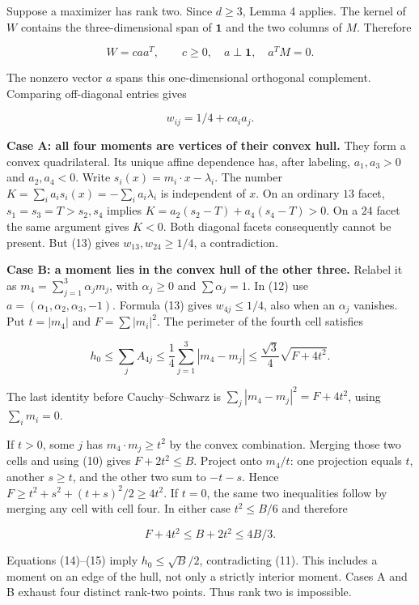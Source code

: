 \documentclass[
  11pt,
]{article}
\begin{document}
Suppose a maximizer has rank two. Since \(d\ge3\), Lemma 4 applies. The
kernel of \(W\) contains the three-dimensional span of \(\mathbf1\) and
the two columns of \(M\). Therefore

\[
 W=c aa^T,\qquad c\ge0,\quad
 a\perp\mathbf1,\quad a^TM=0.                           \tag{12}
\]

The nonzero vector \(a\) spans this one-dimensional orthogonal
complement. Comparing off-diagonal entries gives

\[
 w_{ij}=1/4+c a_i a_j.                                  \tag{13}
\]

\textbf{Case A: all four moments are vertices of their convex hull.}
They form a convex quadrilateral. Its unique affine dependence has,
after labeling, \(a_1,a_3>0\) and \(a_2,a_4<0\). Write
\(s_i(x)=m_i\cdot x-\lambda_i\). The number
\(K=\sum_i a_i s_i(x)=-\sum_i a_i\lambda_i\) is independent of \(x\). On
an ordinary \(13\) facet, \(s_1=s_3=T>s_2,s_4\) implies
\(K=a_2(s_2-T)+a_4(s_4-T)>0\). On a \(24\) facet the same argument gives
\(K<0\). Both diagonal facets consequently cannot be present. But (13)
gives \(w_{13},w_{24}\ge1/4\), a contradiction.

\textbf{Case B: a moment lies in the convex hull of the other three.}
Relabel it as \(m_4=\sum_{j=1}^3\alpha_jm_j\), with \(\alpha_j\ge0\) and
\(\sum\alpha_j=1\). In (12) use \(a=(\alpha_1,\alpha_2,\alpha_3,-1)\).
Formula (13) gives \(w_{4j}\le1/4\), also when an \(\alpha_j\) vanishes.
Put \(t=|m_4|\) and \(F=\sum|m_i|^2\). The perimeter of the fourth cell
satisfies

\[
 h_0\le\sum_j A_{4j}
    \le\frac14\sum_{j=1}^3|m_4-m_j|
    \le\frac{\sqrt3}{4}\sqrt{F+4t^2}.                    \tag{14}
\]

The last identity before Cauchy--Schwarz is
\(\sum_j|m_4-m_j|^2=F+4t^2\), using \(\sum_i m_i=0\).

If \(t>0\), some \(j\) has \(m_4\cdot m_j\ge t^2\) by the convex
combination. Merging those two cells and using (10) gives
\(F+2t^2\le B\). Project onto \(m_4/t\): one projection equals \(t\),
another \(s\ge t\), and the other two sum to \(-t-s\). Hence
\(F\ge t^2+s^2+(t+s)^2/2\ge4t^2\). If \(t=0\), the same two inequalities
follow by merging any cell with cell four. In either case \(t^2\le B/6\)
and therefore

\[
 F+4t^2\le B+2t^2\le4B/3.                               \tag{15}
\]

Equations (14)--(15) imply \(h_0\le\sqrt B/2\), contradicting (11). This
includes a moment on an edge of the hull, not only a strictly interior
moment. Cases A and B exhaust four distinct rank-two points. Thus rank
two is impossible.
\end{document}
